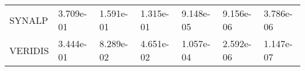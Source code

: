 \begin{tabular}{lllllll}
SYNALP      &                    3.709e-01 &                    1.591e-01 &                    1.315e-01 &                         9.148e-05 &                         9.156e-06 &                         3.786e-06 \\
VERIDIS     &                    3.444e-01 &                    8.289e-02 &                    4.651e-02 &                         1.057e-04 &                         2.592e-06 &                         1.147e-07 \\
\bottomrule
\end{tabular}
